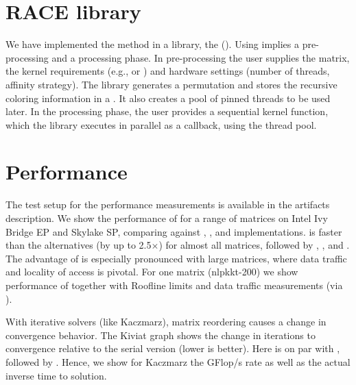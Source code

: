 \section{RACE library}

We have implemented the \RAC method in a library, the \RACEfull (\RACE).
Using \RACE implies a pre-processing and a processing phase.
In pre-processing the user supplies the matrix, the kernel requirements
(e.g., \DONE or \DTWO) and hardware settings (number of threads,
affinity strategy). The library generates a permutation and stores the
recursive coloring information in a \levelTree. It also creates
a pool of pinned threads to be used later. In the processing phase,
the user provides a sequential kernel function, which the library
executes in parallel as a callback, using the thread pool. 

\section{Performance}

The test setup for the performance measurements is available in the
artifacts description. We show the performance of \SymmSpmv %
for a range of matrices on Intel Ivy Bridge EP and Skylake SP,
comparing \RACE against \ABMC, \MC, and \MKL implementations. \RACE is
faster than the alternatives (by up to 2.5$\times$) for almost all
matrices, followed by \ABMC, \MKL, and \MC. The advantage of \RACE is
especially pronounced with large matrices, where data traffic and
locality of access is pivotal. For one matrix (nlpkkt-200) we show
performance of \SymmSpmv together with Roof\/line limits and data
traffic measurements (via \LIKWID \cite{LIKWID}).


With iterative solvers (like Kaczmarz), matrix reordering causes a change
in convergence behavior. The Kiviat graph shows the change in
iterations to convergence relative to the serial version (lower is
better). Here \RACE is on par with
\ABMC, followed by \MC. Hence, we show for Kaczmarz the GFlop/s rate as
well as the actual inverse time to solution.
